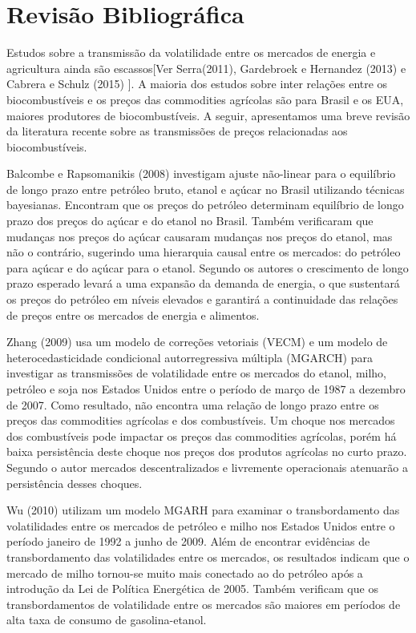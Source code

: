 \documentclass[a4paper,12pt] {article}
\begin{document}
	
\section{Revisão Bibliográfica}
		
	Estudos sobre a transmissão da  volatilidade entre os mercados de energia e agricultura ainda são escassos[Ver Serra(2011), Gardebroek e Hernandez (2013) e Cabrera e Schulz (2015) ]. A maioria dos estudos sobre inter relações entre os biocombustíveis e os preços das commodities agrícolas são para  Brasil e os EUA,  maiores produtores de biocombustíveis. A seguir, apresentamos uma breve revisão  da literatura recente sobre as transmissões de preços relacionadas aos biocombustíveis.   
	
	Balcombe e Rapsomanikis (2008) investigam  ajuste não-linear para o equilíbrio de longo prazo entre petróleo bruto, etanol e açúcar no Brasil utilizando técnicas bayesianas.  Encontram que os preços do petróleo determinam equilíbrio de longo prazo dos preços do açúcar e do etanol no Brasil. Também verificaram que mudanças nos preços do açúcar causaram mudanças nos preços do etanol, mas não o contrário, sugerindo uma hierarquia causal entre os mercados: do petróleo para açúcar e do açúcar para o etanol. Segundo os autores o crescimento de longo prazo esperado levará a uma expansão da demanda de energia, o que sustentará os preços do petróleo em níveis elevados e garantirá a continuidade das relações de preços entre os mercados de energia e alimentos. 
	
	Zhang (2009) usa um modelo de correções vetoriais (VECM) e um modelo de heterocedasticidade  condicional autorregressiva múltipla (MGARCH) para investigar as transmissões de volatilidade entre os mercados do etanol, milho, petróleo e soja nos Estados Unidos entre o período de março de 1987 a dezembro de 2007. Como resultado, não encontra uma relação de longo prazo entre os preços das commodities agrícolas e dos combustíveis. Um choque nos mercados dos combustíveis pode impactar os preços das commodities agrícolas, porém há baixa persistência deste choque nos preços dos produtos agrícolas no curto prazo.  Segundo o autor  mercados descentralizados e livremente operacionais atenuarão a persistência desses choques.
	
	Wu (2010) utilizam um modelo MGARH para examinar o transbordamento das volatilidades entre os mercados de petróleo e milho nos Estados Unidos entre o período janeiro de 1992 a junho de 2009. Além de encontrar evidências de transbordamento das volatilidades entre os mercados, os  resultados indicam que o mercado de milho tornou-se muito mais conectado ao  do petróleo após a introdução da Lei de Política Energética de 2005. Também verificam que os transbordamentos de volatilidade entre os mercados são maiores em períodos de alta taxa de consumo de gasolina-etanol. 
	
\end{document}
